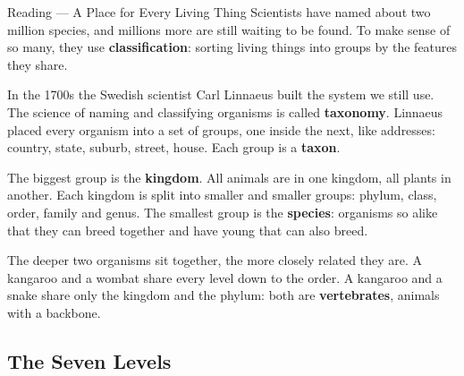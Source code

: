 \label{read:2}

\begin{readingbox}{Reading --- A Place for Every Living Thing}
Scientists have named about two million species, and millions more are still waiting to be found. To make sense of so many, they use \textbf{classification}: sorting living things into groups by the features they share.

In the 1700s the Swedish scientist Carl Linnaeus built the system we still use. The science of naming and classifying organisms is called \textbf{taxonomy}. Linnaeus placed every organism into a set of groups, one inside the next, like addresses: country, state, suburb, street, house. Each group is a \textbf{taxon}.

The biggest group is the \textbf{kingdom}. All animals are in one kingdom, all plants in another. Each kingdom is split into smaller and smaller groups: phylum, class, order, family and genus. The smallest group is the \textbf{species}: organisms so alike that they can breed together and have young that can also breed.

The deeper two organisms sit together, the more closely related they are. A kangaroo and a wombat share every level down to the order. A kangaroo and a snake share only the kingdom and the phylum: both are \textbf{vertebrates}, animals with a backbone.
\end{readingbox}

\rcreset
{}

\label{theory:2}

\subsection{The Seven Levels}\label{sub:2.1}

\begin{center}
\end{center}

